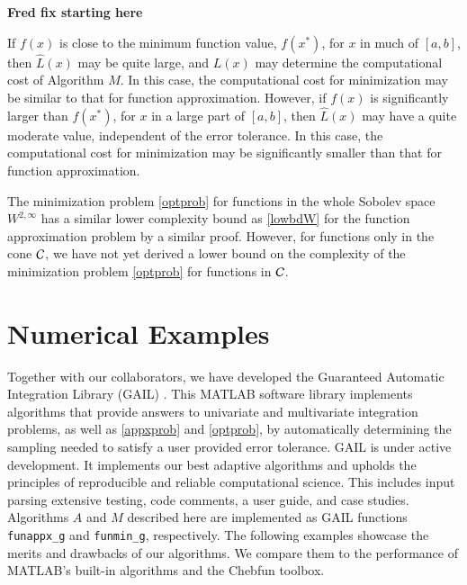 \documentclass[review]{elsarticle}
\theoremstyle{definition}
\renewcommand{\cw}{W}
\newcommand{\chL}{\widehat{L}}
\newcommand{\funappxg}{\texttt{funappx\_g}\xspace}
\newcommand{\funming}{\texttt{funmin\_g}\xspace}
\begin{document}
\textbf{Fred fix starting here}

If $f(x)$ is close to the minimum function value, $f(x^*)$, for $x$ in much of
$[a,b]$, then $\chL(x)$ may be quite large, and $L(x)$ may determine the
computational cost of Algorithm $M$. In this case, the computational cost for
minimization may be similar to that for function approximation. However, if
$f(x)$ is significantly larger than $f(x^*)$, for $x$ in a large part of
$[a,b]$, then $\chL(x)$ may have a quite moderate value, independent of the
error tolerance. In this case, the computational cost for minimization may be
significantly smaller than that for function approximation.


The minimization problem \eqref{optprob} for functions in the whole Sobolev
space $\cw^{2,\infty}$ has a similar lower complexity bound as \eqref{lowbdW}
for the function approximation problem by a similar proof. However, for
functions only in the cone $\mathcal{C}$, we have not yet derived a lower bound on the 
complexity of the minimization problem \eqref{optprob} for functions in $\mathcal{C}$.

\section{Numerical Examples} \label{sec:examples}

Together with our collaborators, we have developed the Guaranteed Automatic
Integration Library (GAIL) \cite{ChoEtal15a}. This MATLAB software library
implements algorithms that provide answers to univariate and multivariate
integration problems, as well as \eqref{appxprob} and \eqref{optprob}, by
automatically determining the sampling needed to satisfy a user provided error
tolerance. GAIL is under active development. It implements our best adaptive
algorithms and upholds the principles of reproducible and reliable computational
science. This includes input parsing extensive testing, code comments, a user
guide, and case studies. Algorithms $A$ and $M$ described here are implemented
as GAIL functions \funappxg{} and \funming, respectively. The following examples
showcase the merits and drawbacks of our algorithms. We compare them to the
performance of MATLAB's built-in algorithms and the Chebfun toolbox.
\end{document}
